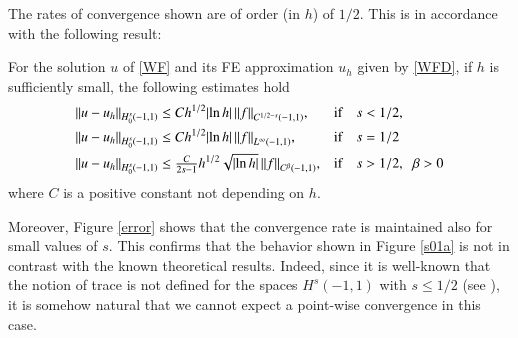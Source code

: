 The rates of convergence shown are of order (in $h$) of $1/2$. This is in accordance with the following result: 
\begin{theorem}
For the solution $u$ of \eqref{WF} and its FE approximation $u_h$ given by \eqref{WFD}, if $h$ is sufficiently small, the following estimates hold
\begin{align*}
	&{\left\|u-u_h\right\|}_{H^s_0(-1,1)}\leq C h^{1/2}|\!\ln h|\,{\left\|f\right\|}_{C^{1/2-s}(-1,1)},& &\textnormal{if}\quad s<1/2, 
	\\
	&{\left\|u-u_h\right\|}_{H^s_0(-1,1)}\leq C h^{1/2} |\!\ln h|\, {\left\|f\right\|}_{L^\infty(-1,1)},& &\textnormal{if}\quad  s=1/2 
	\\
	&{\left\|u-u_h\right\|}_{H^s_0(-1,1)}\leq \tfrac{C}{2s-1} h^{1/2} \sqrt{|\!\ln h|}\, {\left\|f\right\|}_{C^\beta(-1,1)},& &\textnormal{if} \quad s>1/2,\;\;\beta>0
\end{align*}
where $C$ is a positive constant not depending on $h$. 
\end{theorem}

Moreover, Figure \ref{error} shows that the convergence rate is maintained also for small values of $s$. This confirms that the behavior shown in Figure \ref{s01a} is not in contrast with the known theoretical results. Indeed, since it is well-known that the notion of trace is not defined for the spaces $H^s(-1,1)$ with $s\leq 1/2$ (see \cite{jllions1972non,tartar2007introduction}), it is somehow natural that we cannot expect a point-wise convergence in this case.  

